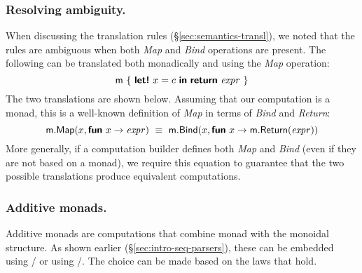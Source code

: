 \documentclass[runningheads,a4paper]{llncs}
\begin{document}
\subsubsection{Resolving ambiguity.} When discussing the translation rules 
(\S\ref{sec:semantics-transl}), we noted that the rules are ambiguous when both \emph{Map} and
\emph{Bind} operations are present. The following can be translated both monadically and 
using the \emph{Map} operation:
%
\begin{equation*}
\ident{m}~\{~\kvd{let!}~x = c~\kvd{in}~\kvd{return}~\expr~\}\\
\end{equation*}
%
The two translations are shown below. Assuming that our computation is a monad,
this is a well-known definition of \emph{Map} in terms of \emph{Bind} and \emph{Return}:
%
\begin{equation*}
\textnormal{\sffamily m}.\textnormal{\sffamily Map}(x, \textnormal{\bfseries\sffamily fun}~x \rightarrow \textnormal{\emph{expr}}) ~\equiv~
  \textnormal{\sffamily m}.\textnormal{\sffamily Bind}(x, \textnormal{\bfseries\sffamily fun}~x \rightarrow \textnormal{\sffamily m}.\textnormal{\sffamily Return}(\textnormal{\emph{expr}}))\\
\end{equation*}
%
More generally, if a computation builder defines both \emph{Map} and \emph{Bind} (even if they are
not based on a monad), we require this equation to guarantee that the two possible translations 
produce equivalent computations.

\subsubsection{Additive monads.} Additive monads are computations that combine monad with 
the monoidal structure. As shown earlier (\S\ref{sec:intro-seq-parsers}), these can be embedded
using / or using /. The choice can be made
based on the laws that hold.
\end{document}
